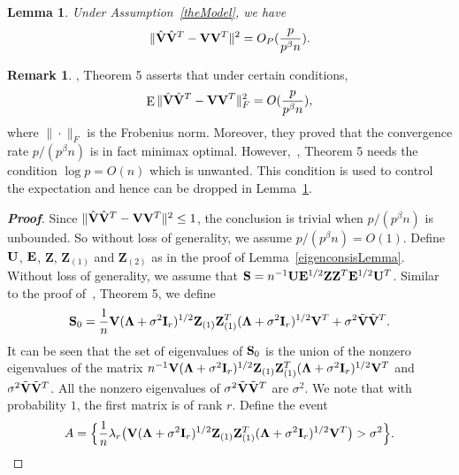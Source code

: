 \documentclass[3p]{elsarticle}
\DeclareMathOperator{\myE}{E}
\newcommand{\bZ}{\mathbf{Z}}
\theoremstyle{plain}
\newtheorem{lemma}{\quad\quad Lemma}
\theoremstyle{definition}
\newtheorem{remark}{\quad\quad Remark}
\theoremstyle{remark}
\begin{document}
\begin{appendices}
\begin{lemma}\label{conRateLemma}
    Under Assumption~\ref{theModel}, we have
\begin{equation*}
\|\hat{\mathbf{V}}\hat{\mathbf{V}}^T-\mathbf{V}\mathbf{V}^T\|^2 =O_P(\frac{p}{p^{\beta}n}).
\end{equation*}
\end{lemma}
\begin{remark}
\cite{Cai2012Sparse}, Theorem 5 asserts that under certain conditions,
$$
\myE \|\hat{\BV}\hat{\BV}^T-\BV\BV^T\|_F^2 =O(\frac{p}{p^{\beta}n}),
    $$
    where $\|\cdot\|_F$ is the Frobenius norm.
    Moreover, they proved that the convergence rate $p/(p^{\beta}n)$ is in fact minimax optimal.
    However,~\cite{Cai2012Sparse}, Theorem 5 needs the condition $\log p=O(n)$ which is unwanted.
    This condition is used to control the expectation and hence can be dropped in Lemma~\ref{conRateLemma}.
\end{remark}
\begin{proof}[\textbf{Proof}]
    Since $\|\hat{\mathbf{V}}\hat{\mathbf{V}}^T-\mathbf{V}\mathbf{V}^T\|^2\leq 1$, the conclusion is trivial when $p/(p^{\beta} n)$ is unbounded.
    So without loss of generality, we assume $p/(p^{\beta} n)=O(1)$.
    Define $\mathbf{U}$, $\mathbf{E}$, $\bZ$, $\bZ_{(1)}$ and $\bZ_{(2)}$ as in the proof of Lemma~\ref{eigenconsisLemma}.
Without loss of generality, we assume that $\BS= n^{-1}\BU\BE^{1/2}\bZ \bZ^T \BE^{1/2} \BU^T$. 
    Similar to the proof of~\cite{Cai2012Sparse}, Theorem 5,
we define 
    $$
    \BS_0=
        \frac{1}{n}\BV(\bLambda+\sigma^2\BI_r)^{1/2}\bZ_{(1)} \bZ_{(1)}^T(\bLambda+\sigma^2\BI_r)^{1/2}\BV^T
        +\sigma^2\tilde{\BV}\tilde{\BV}^T.
    $$
    It can be seen that the set of eigenvalues of $\mathbf{S}_0$ is the union of the nonzero eigenvalues of the matrix $n^{-1}\BV(\bLambda+\sigma^2\BI_r)^{1/2}\bZ_{(1)} \bZ_{(1)}^T(\bLambda+\sigma^2\BI_r)^{1/2}\BV^T$ and $\sigma^2\tilde{\mathbf{V}}\tilde{\mathbf{V}}^T$.
All the nonzero eigenvalues of $\sigma^2\tilde{\mathbf{V}}\tilde{\mathbf{V}}^T$ are $\sigma^2$.
We note that with probability $1$, the first matrix is of rank $r$.
        Define the event
        $$
        A=
        \Big\{
        \frac{1}{n}\lambda_r\big(\BV(\bLambda+\sigma^2 \BI_r)^{1/2}\bZ_{(1)} \bZ_{(1)}^T(\bLambda+\sigma^2 \BI_r)^{1/2}\BV^T\big)
        >\sigma^2
        \Big\}.
        $$

\end{proof}
\end{appendices}
\end{document}
